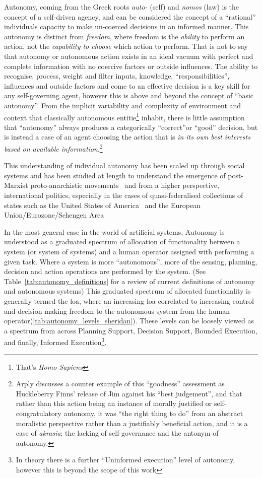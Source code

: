 Autonomy, coming from the Greek roots \textit{auto-} (self) and \textit{nomos} (law) is the concept of a self-driven agency, and can be considered the concept of a ``rational'' individuals capacity to make un-coerced decisions in an informed manner. 
This autonomy is distinct from \textit{freedom}, where freedom is the \textit{ability} to perform an action, not the \textit{capability to choose} which action to perform.
That is not to say that autonomy or autonomous action exists in an ideal vacuum with perfect and complete information with no coercive factors or outside influences.
The ability to recognise, process, weight and filter inputs, knowledge, ``responsibilities'', influences and outside factors and come to an effective decision is a key skill for any self-governing agent, however this is above and beyond the concept of ``basic autonomy''.
From the implicit variability and complexity of environment and context that classically autonomous entitie\footnote{That's \textit{Homo Sapiens}} inhabit, there is little assumption that ``autonomy'' always produces a categorically ``correct''or ``good'' decision, but is instead a case of an agent choosing the action that is \textit{in its own best interests based on available information}\cite{Arpaly2003}.\footnote{Arply discusses a counter example of this ``goodness'' assessment as  Huckleberry Finns' release of Jim against his ``best judgement'', and that rather than this action being an instance of morally justified or self-congratulatory autonomy, it was ``the right thing to do'' from an abstract moralistic perspective rather than a justifiably beneficial action, and it is a case of \textit{akrasia}; the lacking of self-governance and the antonym of autonomy.}

This understanding of individual autonomy has been scaled up through social systems and has been studied at length to understand the emergence of post-Marxist proto-anarchistic movements~\cite{Hunter2016} and from a higher perspective, international politics, especially in the cases of quasi-federalised collections of states such as the United States of America~\cite{Halberstam2001} and the European Union/Eurozone/Schengen Area~\cite{Richter2012}


In the most general case in the world of artificial systems, Autonomy is understood as a graduated spectrum of allocation of functionality between a system (or system of systems) and a human operator assigned with performing a given task. 
Where a system is more ``autonomous'', more of the sensing, planning, decision and action operations are performed by the system. (See Table~\ref{tab:autonomy_definitions} for a review of current definitions of autonomy and autonomous systems)
This graduated spectrum of allocated functionality is generally termed the \gls{loa}, where an increasing \gls{loa} correlated to increasing control and decision making freedom to the autonomous system from the human operator(\autoref{tab:autonomy_levels_sheridan}).
These levels can be loosely viewed as a spectrum from across Planning Support, Decision Support, Bounded Execution, and finally, Informed Execution\footnote{In theory there is a further ``Uninformed execution'' level of autonomy, however this is beyond the scope of this work\cite{Cameron1984}}.

